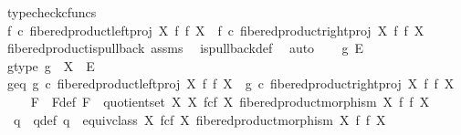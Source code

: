 \begin{isabellebody}
\ typecheck{\isacharunderscore}{\kern0pt}cfuncs\isanewline
\ \ \isamarkupfalse%
\ {\isachardoublequoteopen}f\ {\isasymcirc}\isactrlsub c\ fibered{\isacharunderscore}{\kern0pt}product{\isacharunderscore}{\kern0pt}left{\isacharunderscore}{\kern0pt}proj\ X\ f\ f\ X\ {\isacharequal}{\kern0pt}\ f\ {\isasymcirc}\isactrlsub c\ fibered{\isacharunderscore}{\kern0pt}product{\isacharunderscore}{\kern0pt}right{\isacharunderscore}{\kern0pt}proj\ X\ f\ f\ X{\isachardoublequoteclose}\isanewline
\ \ \ \ \isamarkupfalse%
\ fibered{\isacharunderscore}{\kern0pt}product{\isacharunderscore}{\kern0pt}is{\isacharunderscore}{\kern0pt}pullback\ assms\ \isamarkupfalse%
\ is{\isacharunderscore}{\kern0pt}pullback{\isacharunderscore}{\kern0pt}def\ \isamarkupfalse%
\ auto\isanewline
{}\isamarkupfalse%
\isanewline
\ \ \isamarkupfalse%
\ g\ E\isanewline
\ \ \isamarkupfalse%
\ g{\isacharunderscore}{\kern0pt}type{\isacharcolon}{\kern0pt}\ {\isachardoublequoteopen}g\ {\isacharcolon}{\kern0pt}\ X\ {\isasymrightarrow}\ E{\isachardoublequoteclose}\isanewline
\ \ \isamarkupfalse%
\ g{\isacharunderscore}{\kern0pt}eq{\isacharcolon}{\kern0pt}\ {\isachardoublequoteopen}g\ {\isasymcirc}\isactrlsub c\ fibered{\isacharunderscore}{\kern0pt}product{\isacharunderscore}{\kern0pt}left{\isacharunderscore}{\kern0pt}proj\ X\ f\ f\ X\ {\isacharequal}{\kern0pt}\ g\ {\isasymcirc}\isactrlsub c\ fibered{\isacharunderscore}{\kern0pt}product{\isacharunderscore}{\kern0pt}right{\isacharunderscore}{\kern0pt}proj\ X\ f\ f\ X{\isachardoublequoteclose}\isanewline
\isanewline
\ \ \isamarkupfalse%
\ \ F\ \ F{\isacharunderscore}{\kern0pt}def{\isacharcolon}{\kern0pt}\ {\isachardoublequoteopen}F\ {\isacharequal}{\kern0pt}\ quotient{\isacharunderscore}{\kern0pt}set\ X\ {\isacharparenleft}{\kern0pt}X\ \isactrlbsub f\isactrlesub {\isasymtimes}\isactrlsub c\isactrlbsub f\isactrlesub \ X{\isacharcomma}{\kern0pt}\ fibered{\isacharunderscore}{\kern0pt}product{\isacharunderscore}{\kern0pt}morphism\ X\ f\ f\ X{\isacharparenright}{\kern0pt}{\isachardoublequoteclose}\isanewline
\ \ \isamarkupfalse%
\ \ q\ \ q{\isacharunderscore}{\kern0pt}def{\isacharcolon}{\kern0pt}\ {\isachardoublequoteopen}q\ {\isacharequal}{\kern0pt}\ equiv{\isacharunderscore}{\kern0pt}class\ {\isacharparenleft}{\kern0pt}X\ \isactrlbsub f\isactrlesub {\isasymtimes}\isactrlsub c\isactrlbsub f\isactrlesub \ X{\isacharcomma}{\kern0pt}\ fibered{\isacharunderscore}{\kern0pt}product{\isacharunderscore}{\kern0pt}morphism\ X\ f\ f\ X{\isacharparenright}{\kern0pt}{\isachardoublequoteclose}\ \isanewline

\end{isabellebody}
